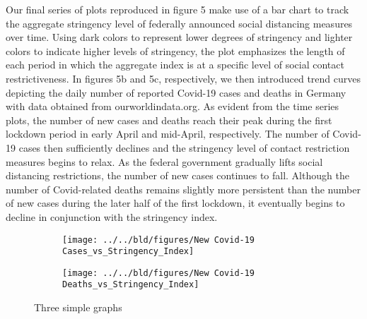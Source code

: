 Our final series of plots reproduced in figure 5 make use of a bar chart to track the aggregate stringency level of federally announced social distancing measures over time. Using dark colors to represent lower degrees of stringency and lighter colors to indicate higher levels of stringency, the plot emphasizes the length of each period in which the aggregate index is at a specific level of social contact restrictiveness. In figures 5b and 5c, respectively, we then introduced trend curves depicting the daily number of reported Covid-19 cases and deaths in Germany with data obtained from ourworldindata.org. As evident from the time series plots, the number of new cases and deaths reach their peak during the first lockdown period in early April and mid-April, respectively. The number of Covid-19 cases then sufficiently declines and the stringency level of contact restriction measures begins to relax. As the federal government gradually lifts social distancing restrictions, the number of new cases continues to fall. Although the number of Covid-related deaths remains slightly more persistent than the number of new cases during the later half of the first lockdown, it eventually begins to decline in conjunction with the stringency index.

\begin{figure}[H]
     \centering
     \begin{subfigure}[b]{0.95\textwidth}
         \centering
         \texttt{[image: ../../bld/figures/New Covid-19 Cases\_vs\_Stringency\_Index]}
         \caption{}
         \label{fig:y equals x}
     \end{subfigure}
     \hfill
     \begin{subfigure}[b]{0.95\textwidth}
         \centering
         \texttt{[image: ../../bld/figures/New Covid-19 Deaths\_vs\_Stringency\_Index]}
         \caption{}
         \label{fig:three sin x}
     \end{subfigure}
        \caption{Three simple graphs}
         \label{fig:four graphs}
\end{figure}

